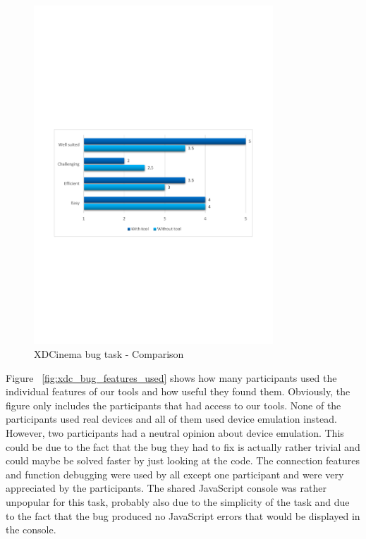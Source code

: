 \begin{figure}[H]
  \centering
    \includegraphics[width=0.8\textwidth]{images/charts/xdc_bug_comparison.pdf}
	\caption{XDCinema bug task - Comparison}
	\label{fig:xdc_bug_comparison}
\end{figure}

Figure ~\ref{fig:xdc_bug_features_used} shows how many participants used the individual features of our tools and how useful they found them. Obviously, the figure only includes the participants that had access to our tools. None of the participants used real devices and all of them used device emulation instead. However, two participants had a neutral opinion about device emulation. This could be due to the fact that the bug they had to fix is actually rather trivial and could maybe be solved faster by just looking at the code. The connection features and function debugging were used by all except one participant and were very appreciated by the participants. The shared JavaScript console was rather unpopular for this task, probably also due to the simplicity of the task and due to the fact that the bug produced no JavaScript errors that would be displayed in the console.


